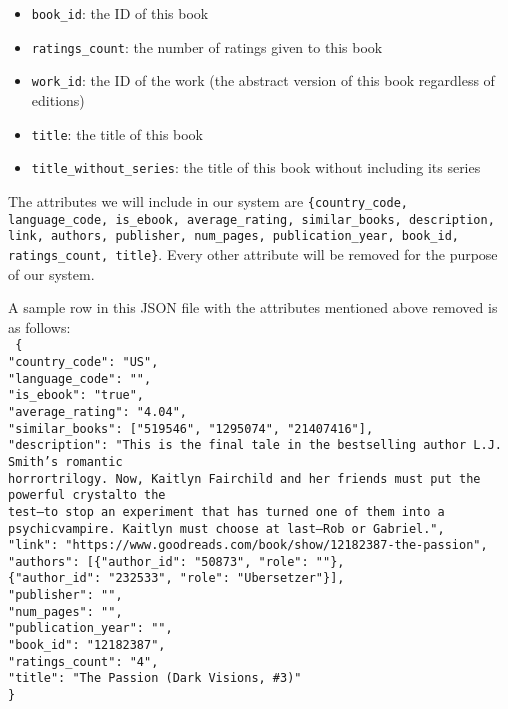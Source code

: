 \documentclass[fontsize=11pt]{article}
\begin{document}
\begin{itemize}
\begin{enumerate}
\begin{itemize}
\item \texttt{book\_id}: the ID of this book
\item \texttt{ratings\_count}: the number of ratings given to this book
\item \texttt{work\_id}: the ID of the work (the abstract version of this book regardless of editions)
\item \texttt{title}: the title of this book
\item \texttt{title\_without\_series}: the title of this book without including its series
\end{itemize}
 
The attributes we will include in our system are \texttt{\{country\_code, language\_code, is\_ebook, average\_rating, similar\_books, description, link, authors, publisher, num\_pages, publication\_year, book\_id, ratings\_count, title\}}. Every other attribute will be removed for the purpose of our system.
 
A sample row in this JSON file with the attributes mentioned above removed is as follows:\\
\texttt{
\{ \\
"country\_code": "US",\\
"language\_code": "",\\
"is\_ebook": "true",\\
"average\_rating": "4.04",\\
"similar\_books": ["519546", "1295074", "21407416"],\\
"description": "This is the final tale in the bestselling author L.J. Smith's romantic \\horrortrilogy. Now, Kaitlyn Fairchild and her friends must put the powerful crystalto the \\
test--to stop an experiment that has turned one of them into a psychicvampire. Kaitlyn must choose at last--Rob or Gabriel.",\\
"link": "https://www.goodreads.com/book/show/12182387-the-passion",\\
"authors": [\{"author\_id": "50873", "role": ""\}, \\
\{"author\_id": "232533", "role": "Ubersetzer"\}],\\
"publisher": "",\\
"num\_pages": "",\\
"publication\_year": "",\\
"book\_id": "12182387",\\
"ratings\_count": "4",\\
"title": "The Passion (Dark Visions, \#3)" \\
\}
} \\


\end{enumerate}
\end{itemize}
\end{document}
